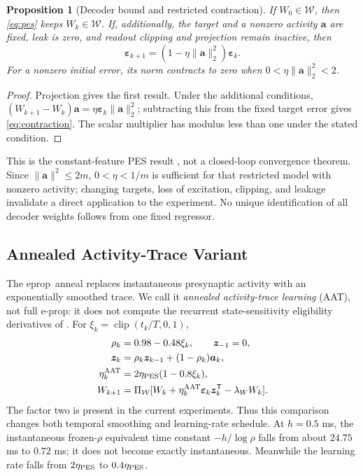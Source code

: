 \documentclass[letterpaper,10pt,conference]{IEEEtran}
\newcommand{\T}{^{\mathsf T}}
\newcommand{\clip}{\operatorname{clip}}
\newtheorem{proposition}{Proposition}
\begin{document}
\begin{proposition}[Decoder bound and restricted contraction]
\label{prop:pes}
If $W_0\in\mathcal W$, then \eqref{eq:pes} keeps $W_k\in\mathcal W$.
If, additionally, the target and a nonzero activity $\bm a$ are fixed,
leak is zero, and readout clipping and projection remain inactive, then
\begin{equation}
 \bm\varepsilon_{k+1}
       =(1-\eta\|\bm a\|_2^2)\bm\varepsilon_k.
 \label{eq:contraction}
\end{equation}
For a nonzero initial error, its norm contracts to zero when
$0<\eta\|\bm a\|_2^2<2$.
\end{proposition}
\begin{proof}
Projection gives the first result. Under the additional conditions,
$(W_{k+1}-W_k)\bm a=\eta\bm\varepsilon_k\|\bm a\|_2^2$;
subtracting this from the fixed target error gives
\eqref{eq:contraction}. The scalar multiplier has modulus less than one
under the stated condition.
\end{proof}
This is the constant-feature PES result \cite{voelker2015pes}, not a
closed-loop convergence theorem. Since $\|\bm a\|^2\le2m$,
$0<\eta<1/m$ is sufficient for that restricted model with nonzero
activity; changing targets, loss of excitation, clipping, and leakage
invalidate a direct application to the experiment. No unique identification
of all decoder weights follows from one fixed regressor.

\subsection{Annealed Activity-Trace Variant}
\label{sec:anneal}
The eprop~anneal replaces instantaneous
presynaptic activity with an exponentially smoothed trace. We call it
\emph{annealed activity-trace learning} (AAT), not full e-prop: it does not
compute the recurrent state-sensitivity eligibility derivatives of
\cite{bellec2020eprop}. For $\xi_k=\clip(t_k/T,0,1)$,
\begin{align}
 \rho_k&=0.98-0.48\xi_k,\qquad \bm z_{-1}=0,\\
 \bm z_k&=\rho_k\bm z_{k-1}+(1-\rho_k)\bm a_k,\\
 \eta_k^{\rm AAT}&=2\eta_{\rm PES}(1-0.8\xi_k),\\
 W_{k+1}&=\Pi_{\mathcal W}
 [W_k+\eta_k^{\rm AAT}\bm\varepsilon_k\bm z_k\T-\lambda_WW_k].
 \label{eq:aat}
\end{align}
The factor two is present in the current experiments. Thus this comparison
changes both temporal smoothing and learning-rate schedule. At
$h=0.5$ ms, the instantaneous frozen-$\rho$ equivalent time constant
$-h/\log\rho$ falls from about $24.75$ ms to $0.72$ ms; it does not become
exactly instantaneous. Meanwhile the learning rate falls from
$2\eta_{\rm PES}$ to $0.4\eta_{\rm PES}$.
\end{document}
